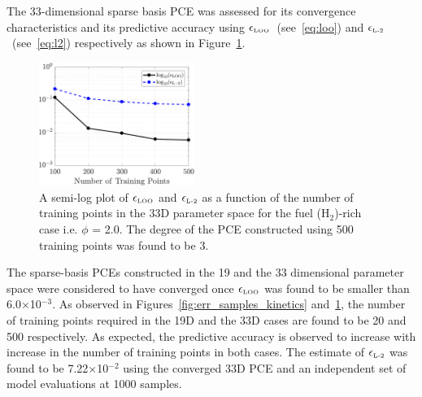 The 33-dimensional sparse basis PCE was assessed for its convergence characteristics
and its predictive accuracy using $\epsilon_{\mbox{\tiny LOO}}$~(see~\eqref{eq:loo}) and
$\epsilon_{\mbox{\tiny{L-2}}}$~(see~\eqref{eq:l2}) respectively as shown in
Figure~\ref{fig:err_samples}.  
%
\begin{figure}[htbp]
 \begin{center}
  \includegraphics[width=0.45\textwidth]{./Figures/err_samples_kinetics33D}
\caption{A semi-log plot of $\epsilon_\text{\tiny LOO}$  and $\epsilon_{\mbox{\tiny{L-2}}}$
as a function of the number of training points in the 33D parameter space 
for the fuel (H$_2$)-rich case i.e. $\phi$ = 2.0. The degree of
the PCE constructed using 500 training points was found to be 3.}
\label{fig:err_samples}
\end{center}
\end{figure}
%
The sparse-basis PCEs constructed in the 19 and the 33 dimensional parameter
space were considered to have converged once $\epsilon_\text{\tiny LOO}$ was found to be
smaller than 6.0$\times$10$^{-3}$. As observed in Figures~\ref{fig:err_samples_kinetics}
and~\ref{fig:err_samples}, the number of training points required in the 19D
and the 33D cases are found to be 20 and 500 respectively. As expected, the predictive
accuracy is observed to increase with increase in the number of training points in both cases.
The estimate of $\epsilon_{\mbox{\tiny{L-2}}}$ was found to be 7.22$\times$10$^{-2}$ using the
converged 33D PCE and an independent set of model evaluations at 1000 samples.

